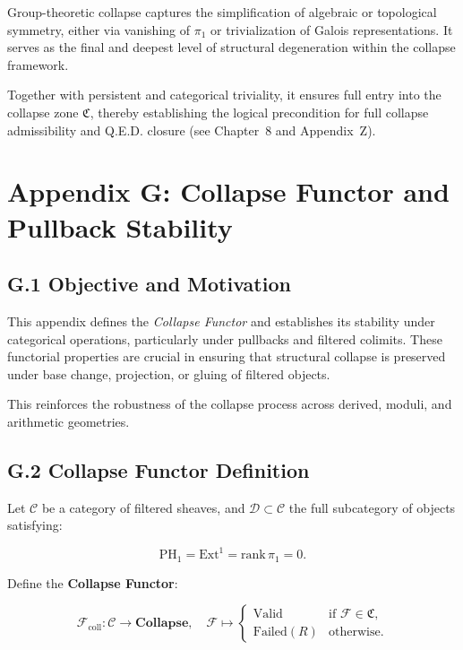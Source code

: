 \documentclass[11pt]{article}
\begin{document}
Group-theoretic collapse captures the simplification of algebraic or topological symmetry, either via vanishing of \( \pi_1 \) or trivialization of Galois representations. It serves as the final and deepest level of structural degeneration within the collapse framework.

Together with persistent and categorical triviality, it ensures full entry into the collapse zone \( \mathfrak{C} \), thereby establishing the logical precondition for full collapse admissibility and Q.E.D. closure (see Chapter~8 and Appendix~Z).



\appendix
\section*{Appendix G: Collapse Functor and Pullback Stability}

\subsection*{G.1 Objective and Motivation}

This appendix defines the \emph{Collapse Functor} and establishes its stability under categorical operations, particularly under pullbacks and filtered colimits. These functorial properties are crucial in ensuring that structural collapse is preserved under base change, projection, or gluing of filtered objects.

This reinforces the robustness of the collapse process across derived, moduli, and arithmetic geometries.

\subsection*{G.2 Collapse Functor Definition}

Let \( \mathcal{C} \) be a category of filtered sheaves, and \( \mathcal{D} \subset \mathcal{C} \) the full subcategory of objects satisfying:

\[
\mathrm{PH}_1 = \mathrm{Ext}^1 = \mathrm{rank}\, \pi_1 = 0.
\]

Define the \textbf{Collapse Functor}:

\[
\mathcal{F}_{\mathrm{coll}} : \mathcal{C} \to \mathbf{Collapse},
\quad \mathcal{F} \mapsto
\begin{cases}
  \text{Valid} & \text{if } \mathcal{F} \in \mathfrak{C}, \\
  \text{Failed}(R) & \text{otherwise}.
\end{cases}
\]
\end{document}
